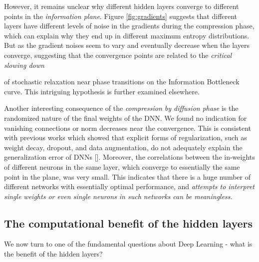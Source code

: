 \documentclass[11pt]{article}
\newcommand{\ignore}[1]{}
\begin{document}
However, it remains unclear why different hidden layers converge to different points in the \textit{information plane}. Figure \ref{fig:gradients} suggests that different layers have different levels of noise in the gradients during the compression phase, which can explain why they end up in different maximum entropy distributions. But as the gradient noises seem to vary and eventually decrease when the layers converge, suggesting that the convergence points are related to the \emph{critical slowing down} 
\ignore{\ravidcomment{I think we need to say what is critical slowing down, maybe -  critical slowing down is a phenomenon where  system dynamics should recover more slowly from small perturbations upon approaching the bifurcation or tipping point. Critical slowing down can be monitored by measuring the recovery rate of system variables after small perturbations but also manifests itself by an increase in its fluctuations, i.e. variance due to the longer relaxation times near the bifurcation} [\citet{wissel1984universal}, \citet{ives1995measuring}] } 
of stochastic relaxation near phase transitions on the Information Bottleneck curve. 
This intriguing hypothesis is further examined elsewhere. 

Another interesting consequence of the \emph{compression by diffusion phase} is the randomized nature of the final weights of the DNN. We found no indication for vanishing connections or norm decreases near the convergence. This
is consistent with previous works which showed that explicit forms of regularization, such as weight decay, dropout, and data augmentation, do not adequately explain the generalization error of DNNs [\citet{DBLP:journals/corr/ZhangBHRV16}]. Moreover, the correlations between the in-weights of different neurons in the same layer, which converge to essentially the same point in the plane, was very small. This indicates that there is a huge number of different networks with essentially optimal performance, and \emph{attempts to interpret single weights or even single neurons in such networks can be meaningless. }

\subsection{The computational benefit of the hidden layers}

We now turn to one of the fundamental questions about Deep Learning - what is the benefit of the hidden layers? 
\end{document}
